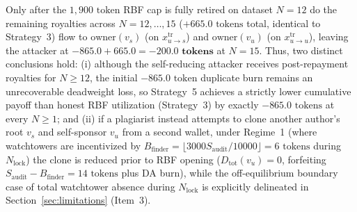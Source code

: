 \documentclass[runningheads,a4paper]{llncs}
\renewcommand{\_}{\textunderscore\allowbreak}
\begin{document}
\begin{enumerate}
Only after the $1,900\text{ token}$ RBF cap is fully retired on dataset $N = 12$ do the remaining royalties across $N = 12,\allowbreak \dots,\allowbreak 15$ ($+665.0\text{ tokens}$ total, identical to Strategy~3) flow to $\text{owner}(v_s)$ (on $x_{u \to s}^{\text{tr}}$) and $\text{owner}(v_u)$ (on $x_{u \to u}^{\text{tr}}$), leaving the attacker at $-865.0 + 665.0 = \mathbf{-200.0\text{ tokens}}$ at $N = 15$. Thus, two distinct conclusions hold: (i) although the self-reducing attacker receives post-repayment royalties for $N \ge 12$, the initial $-865.0\text{ token}$ duplicate burn remains an unrecoverable deadweight loss, so Strategy~5 achieves a strictly lower cumulative payoff than honest RBF utilization (Strategy~3) by exactly $-865.0\text{ tokens}$ at every $N \ge 1$; and (ii) if a plagiarist instead attempts to clone another author's root $v_s$ and self-sponsor $v_u$ from a second wallet, under Regime~1 (where watchtowers are incentivized by $B_{\text{finder}} = \lfloor 3000 S_{\text{audit}} / 10000 \rfloor = 6\text{ tokens}$ during $N_{\text{lock}}$) the clone is reduced prior to RBF opening ($D_{\text{tot}}(v_u) = 0$, forfeiting $S_{\text{audit}} - B_{\text{finder}} = 14\text{ tokens}$ plus DA burn), while the off-equilibrium boundary case of total watchtower absence during $N_{\text{lock}}$ is explicitly delineated in Section~\ref{sec:limitations} (Item~3).
\end{enumerate}
\end{document}

